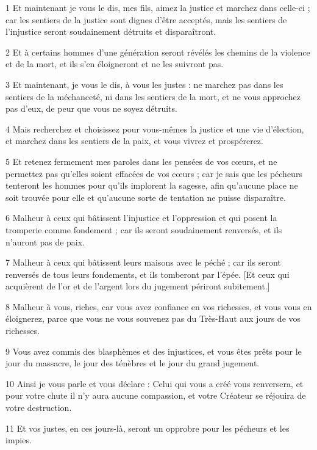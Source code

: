 \par 1 Et maintenant je vous le dis, mes fils, aimez la justice et marchez dans celle-ci ; car les sentiers de la justice sont dignes d'être acceptés, mais les sentiers de l'injustice seront soudainement détruits et disparaîtront.
\par 2 Et à certains hommes d'une génération seront révélés les chemins de la violence et de la mort, et ils s'en éloigneront et ne les suivront pas.
\par 3 Et maintenant, je vous le dis, à vous les justes : ne marchez pas dans les sentiers de la méchanceté, ni dans les sentiers de la mort, et ne vous approchez pas d'eux, de peur que vous ne soyez détruits.
\par 4 Mais recherchez et choisissez pour vous-mêmes la justice et une vie d'élection, et marchez dans les sentiers de la paix, et vous vivrez et prospérerez.
\par 5 Et retenez fermement mes paroles dans les pensées de vos cœurs, et ne permettez pas qu'elles soient effacées de vos cœurs ; car je sais que les pécheurs tenteront les hommes pour qu'ils implorent la sagesse, afin qu'aucune place ne soit trouvée pour elle et qu'aucune sorte de tentation ne puisse disparaître.
\par 6 Malheur à ceux qui bâtissent l'injustice et l'oppression et qui posent la tromperie comme fondement ; car ils seront soudainement renversés, et ils n'auront pas de paix.
\par 7 Malheur à ceux qui bâtissent leurs maisons avec le péché ; car ils seront renversés de tous leurs fondements, et ils tomberont par l'épée. [Et ceux qui acquièrent de l’or et de l’argent lors du jugement périront subitement.]
\par 8 Malheur à vous, riches, car vous avez confiance en vos richesses, et vous vous en éloignerez, parce que vous ne vous souvenez pas du Très-Haut aux jours de vos richesses.
\par 9 Vous avez commis des blasphèmes et des injustices, et vous êtes prêts pour le jour du massacre, le jour des ténèbres et le jour du grand jugement.
\par 10 Ainsi je vous parle et vous déclare : Celui qui vous a créé vous renversera, et pour votre chute il n'y aura aucune compassion, et votre Créateur se réjouira de votre destruction.
\par 11 Et vos justes, en ces jours-là, seront un opprobre pour les pécheurs et les impies.


